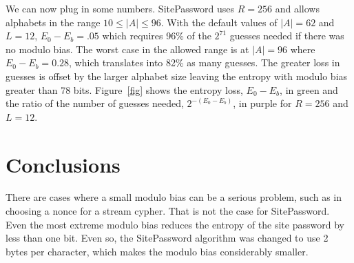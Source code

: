 \documentclass[11pt, oneside]{article}   	%
\begin{document}
We can now plug in some numbers.  SitePassword uses $R = 256$ and allows alphabets in the range $10 \leq |A| \leq 96$.  With the default values of $|A| = 62$ and $L = 12$, $E_0 - E_b = .05$ which requires 96\% of the $2^{71}$ guesses needed if there was no modulo bias.  The worst case in the allowed range is at $|A| = 96$ where $E_0 - E_b = 0.28$, which translates into 82\% as many guesses.  The greater loss in guesses is offset by the larger alphabet size leaving the entropy with modulo bias greater than 78 bits.  Figure~\ref{fig} shows the entropy loss, $E_0 - E_b$, in green and the ratio of the number of guesses needed, $2^{-(E_0-E_b)}$, in purple for $R = 256$ and $L = 12$.

\section{Conclusions}

There are cases where a small modulo bias can be a serious problem, such as in choosing a nonce for a stream cypher.  That is not the case for SitePassword.  Even the most extreme modulo bias reduces the entropy of the site password by less than one bit.  Even so, the SitePassword algorithm was changed to use 2 bytes per character, which makes the modulo bias considerably smaller.
\end{document}
